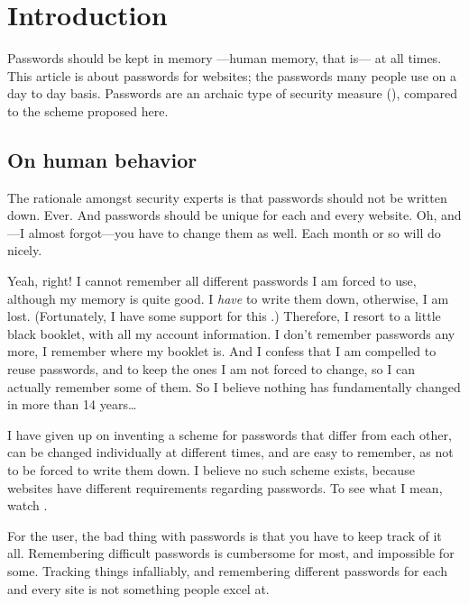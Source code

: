\section{Introduction}
Passwords should be kept in memory%
---human memory, that is---%
at all times.
This article is about passwords for websites; the passwords many people use on a day to day basis.
Passwords are an archaic type of security measure
(\cite{Honan2012}),
compared to the scheme proposed here.

\subsection{On human behavior}
The rationale amongst security experts is that passwords should not be written down.
Ever.
And passwords should be unique for each and every website.
Oh, and---I almost forgot---you have to change them as well.
Each month or so will do nicely. 
\par
Yeah, right!
I cannot remember all different passwords I am forced to use, although my memory is quite good.
I \emph{have} to write them down,
	otherwise,
		I am lost.
(Fortunately,
	I have some support for this \cite{Schneier:2005}.)
Therefore,
	I resort to a little black booklet,
		with all my account information.
I don't remember passwords any more,
	I remember where my booklet is.
And I confess that I am compelled to reuse passwords,
	and to keep the ones I am not forced to change,
		so I can actually remember some of them.
So I believe nothing has fundamentally changed in more than 14 years\ldots\cite{Adams:1999:UE:322796.322806}
\par
I have given up on inventing a scheme for passwords that differ from each other,
can be changed individually at different times, 
and are easy to remember, as not to be forced to write them down.
I believe no such scheme exists, because websites have different requirements regarding passwords.
To see what I mean, watch \cite{youtube:tobyturner}.
\par
For the user, the bad thing with passwords is that you have to keep track of it all.
Remembering difficult passwords is cumbersome for most, and impossible for some.
Tracking things infalliably, and remembering different passwords for each and every site is not something people excel at.

